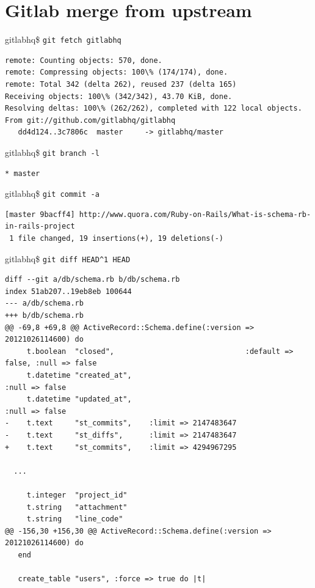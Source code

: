 \documentclass[times, utf8, seminar]{fit}
\begin{document}
\section{Gitlab merge from upstream}

\setlength{\parindent 0cm}
gitlabhq\$ \verb+git fetch gitlabhq+
\begin{lstlisting}
remote: Counting objects: 570, done.
remote: Compressing objects: 100\% (174/174), done.
remote: Total 342 (delta 262), reused 237 (delta 165)
Receiving objects: 100\% (342/342), 43.70 KiB, done.
Resolving deltas: 100\% (262/262), completed with 122 local objects.
From git://github.com/gitlabhq/gitlabhq
   dd4d124..3c7806c  master     -> gitlabhq/master
\end{lstlisting}

gitlabhq\$ \verb+git branch -l+
\begin{lstlisting}
* master
\end{lstlisting}


gitlabhq\$ \verb+git commit -a+
\begin{lstlisting}
[master 9bacff4] http://www.quora.com/Ruby-on-Rails/What-is-schema-rb-in-rails-project
 1 file changed, 19 insertions(+), 19 deletions(-)
\end{lstlisting}


gitlabhq\$ \verb+git diff HEAD^1 HEAD+
\begin{lstlisting}
diff --git a/db/schema.rb b/db/schema.rb
index 51ab207..19eb8eb 100644
--- a/db/schema.rb
+++ b/db/schema.rb
@@ -69,8 +69,8 @@ ActiveRecord::Schema.define(:version => 20121026114600) do
     t.boolean  "closed",                              :default => false, :null => false
     t.datetime "created_at",                                             :null => false
     t.datetime "updated_at",                                             :null => false
-    t.text     "st_commits",    :limit => 2147483647
-    t.text     "st_diffs",      :limit => 2147483647
+    t.text     "st_commits",    :limit => 4294967295

  ...

     t.integer  "project_id"
     t.string   "attachment"
     t.string   "line_code"
@@ -156,30 +156,30 @@ ActiveRecord::Schema.define(:version => 20121026114600) do
   end
 
   create_table "users", :force => true do |t|
\end{lstlisting}
\end{document}
